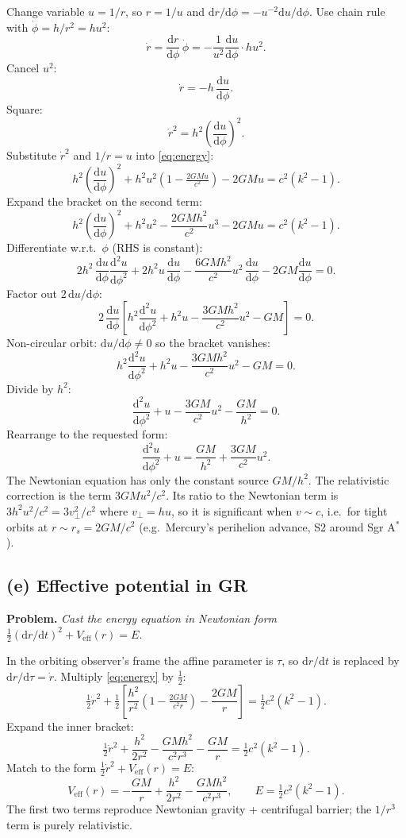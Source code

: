 \documentclass[11pt]{article}
\newcommand{\de}{\mathrm{d}}
\begin{document}
Change variable $u = 1/r$, so $r = 1/u$ and $\de r/\de\phi = -u^{-2}\de u/\de\phi$. Use chain rule with $\dot\phi = h/r^2 = hu^2$:
\[
\dot r = \frac{\de r}{\de\phi}\,\dot\phi = -\frac{1}{u^2}\frac{\de u}{\de\phi}\cdot h u^2.
\]
Cancel $u^2$:
\[
\dot r = -h\,\frac{\de u}{\de\phi}.
\]
Square:
\[
\dot r^2 = h^2\!\left(\frac{\de u}{\de\phi}\right)^{\!2}.
\]
Substitute $\dot r^2$ and $1/r = u$ into \eqref{eq:energy}:
\[
h^2\!\left(\frac{\de u}{\de\phi}\right)^{\!2} + h^2 u^2\!\left(1-\tfrac{2GM u}{c^2}\right) - 2GM u = c^2(k^2-1).
\]
Expand the bracket on the second term:
\[
h^2\!\left(\frac{\de u}{\de\phi}\right)^{\!2} + h^2 u^2 - \frac{2GM h^2}{c^2}u^3 - 2GM u = c^2(k^2-1).
\]
Differentiate w.r.t.\ $\phi$ (RHS is constant):
\[
2h^2\,\frac{\de u}{\de\phi}\frac{\de^2 u}{\de\phi^2} + 2h^2 u\,\frac{\de u}{\de\phi} - \frac{6GM h^2}{c^2}u^2\,\frac{\de u}{\de\phi} - 2GM\frac{\de u}{\de\phi} = 0.
\]
Factor out $2\,\de u/\de\phi$:
\[
2\,\frac{\de u}{\de\phi}\!\left[h^2\frac{\de^2 u}{\de\phi^2} + h^2 u - \frac{3GM h^2}{c^2}u^2 - GM\right] = 0.
\]
Non-circular orbit: $\de u/\de\phi \neq 0$ so the bracket vanishes:
\[
h^2\frac{\de^2 u}{\de\phi^2} + h^2 u - \frac{3GM h^2}{c^2}u^2 - GM = 0.
\]
Divide by $h^2$:
\[
\frac{\de^2 u}{\de\phi^2} + u - \frac{3GM}{c^2}u^2 - \frac{GM}{h^2} = 0.
\]
Rearrange to the requested form:
\[
\boxed{\;\frac{\de^2 u}{\de\phi^2} + u = \frac{GM}{h^2} + \frac{3GM}{c^2}u^2.\;}
\]
\label{eq:orbit}
The Newtonian equation has only the constant source $GM/h^2$. The relativistic correction is the term $3GM u^2/c^2$. Its ratio to the Newtonian term is $3h^2 u^2/c^2 = 3 v_\perp^2/c^2$ where $v_\perp = h u$, so it is significant when $v\sim c$, i.e.\ for tight orbits at $r\sim r_s = 2GM/c^2$ (e.g.\ Mercury's perihelion advance, S2 around Sgr A$^*$).

\subsection*{(e) Effective potential in GR}

\textbf{Problem.} \emph{Cast the energy equation in Newtonian form $\tfrac{1}{2}(\de r/\de t)^2 + V_{\mathrm{eff}}(r) = E$.}

In the orbiting observer's frame the affine parameter is $\tau$, so $\de r/\de t$ is replaced by $\de r/\de\tau = \dot r$. Multiply \eqref{eq:energy} by $\tfrac{1}{2}$:
\[
\tfrac{1}{2}\dot r^2 + \tfrac{1}{2}\!\left[\frac{h^2}{r^2}\!\left(1-\tfrac{2GM}{c^2 r}\right) - \frac{2GM}{r}\right] = \tfrac{1}{2}c^2(k^2-1).
\]
Expand the inner bracket:
\[
\tfrac{1}{2}\dot r^2 + \frac{h^2}{2r^2} - \frac{GM h^2}{c^2 r^3} - \frac{GM}{r} = \tfrac{1}{2}c^2(k^2-1).
\]
Match to the form $\tfrac{1}{2}\dot r^2 + V_{\mathrm{eff}}(r) = E$:
\[
\boxed{\;V_{\mathrm{eff}}(r) = -\frac{GM}{r} + \frac{h^2}{2r^2} - \frac{GM h^2}{c^2 r^3},\qquad E = \tfrac{1}{2}c^2(k^2-1).\;}
\]
\label{eq:Veff}
The first two terms reproduce Newtonian gravity + centrifugal barrier; the $1/r^3$ term is purely relativistic.
\end{document}
